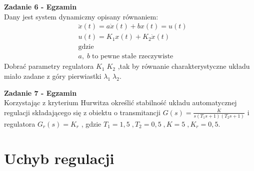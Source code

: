 \documentclass[a4paper,11pt]{article}
\begin{document}
\newpage
\begin{framed}
\textbf{Zadanie 6 - Egzamin} \\ 
Dany jest system dynamiczny opisany równaniem:
\begin{align*}
&\ddot{x}(t)=a\dot{x}(t)+bx(t)=u(t) \\
&u(t)=K_1x(t)+K_2\dot{x}(t) \\
& \text{gdzie} \\
& a, \; b \; \text{to pewne stałe rzeczywiste}
\end{align*}
Dobrać parametry regulatora \( K_1 \; K_2 \) ,tak by równanie charakterystyczne układu miało zadane z góry pierwiastki \( \lambda _1 \; \lambda _2 \). 
\end{framed}

\newpage
\begin{framed}
\textbf{Zadanie 7 - Egzamin} \\ 
Korzystając z kryterium Hurwitza określić stabilność układu automatycznej regulacji składającego się z obiektu o transmitancji \( G(s) = \frac{K}{s(T_1s+1)(T_2s+1)} \) i regulatora \( G_r(s) = K_r \) , gdzie \( T_1 = 1,5 \; , T_2=0,5 \; , K =5 \; , K_r = 0,5 \).  
\begin{figure}[H]
\begin{center}
\end{center}
\end{figure}
\end{framed}




\newpage
\section{Uchyb regulacji}
\end{document}
